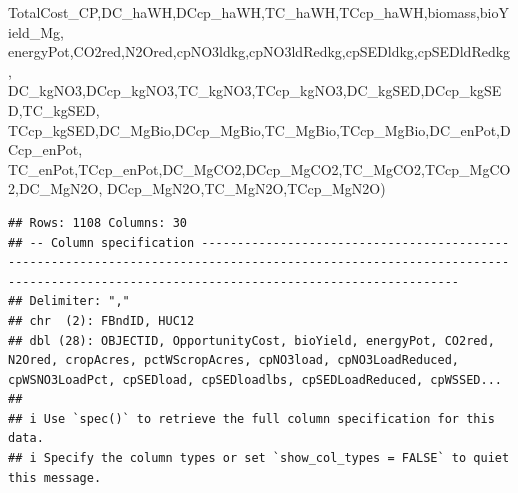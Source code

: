 \documentclass[
]{article}
\newenvironment{Shaded}{\begin{snugshade}}{\end{snugshade}}
\newcommand{\NormalTok}[1]{#1}
\begin{document}
\begin{Shaded}
\begin{Highlighting}[]
\NormalTok{         TotalCost\_CP,DC\_haWH,DCcp\_haWH,TC\_haWH,TCcp\_haWH,biomass,bioYield\_Mg,}
\NormalTok{         energyPot,CO2red,N2Ored,cpNO3ldkg,cpNO3ldRedkg,cpSEDldkg,cpSEDldRedkg,}
\NormalTok{         DC\_kgNO3,DCcp\_kgNO3,TC\_kgNO3,TCcp\_kgNO3,DC\_kgSED,DCcp\_kgSED,TC\_kgSED,}
\NormalTok{         TCcp\_kgSED,DC\_MgBio,DCcp\_MgBio,TC\_MgBio,TCcp\_MgBio,DC\_enPot,DCcp\_enPot,}
\NormalTok{         TC\_enPot,TCcp\_enPot,DC\_MgCO2,DCcp\_MgCO2,TC\_MgCO2,TCcp\_MgCO2,DC\_MgN2O,}
\NormalTok{         DCcp\_MgN2O,TC\_MgN2O,TCcp\_MgN2O)}
\end{Highlighting}
\end{Shaded}

\begin{verbatim}
## Rows: 1108 Columns: 30
## -- Column specification --------------------------------------------------------------------------------------------------------------------------------------------------------------------------------
## Delimiter: ","
## chr  (2): FBndID, HUC12
## dbl (28): OBJECTID, OpportunityCost, bioYield, energyPot, CO2red, N2Ored, cropAcres, pctWScropAcres, cpNO3load, cpNO3LoadReduced, cpWSNO3LoadPct, cpSEDload, cpSEDloadlbs, cpSEDLoadReduced, cpWSSED...
## 
## i Use `spec()` to retrieve the full column specification for this data.
## i Specify the column types or set `show_col_types = FALSE` to quiet this message.
\end{verbatim}
\end{document}

